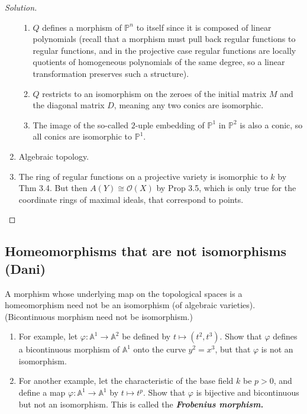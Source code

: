 \begin{manualexercise}{3.1}
\begin{proof}[Solution]
\begin{enumerate}[label=\alph*.]
\begin{enumerate}[label=\textbf{Step \arabic*}]
				\item $Q$ defines a morphism of $\mathbb{P}^n$ to itself since it is composed of linear polynomials (recall that a morphism must pull back regular functions to regular functions, and in the projective case regular functions are locally quotients of homogeneous polynomials of the same degree, so a linear transformation preserves such a structure).

				\item $Q$ restricts to an isomorphism on the zeroes of the initial matrix $M$ and the diagonal matrix $D$, meaning any two conics are isomorphic.

				\item The image of the so-called $2$-uple embedding of $\mathbb{P}^1$ in $\mathbb{P}^2$ is also a conic, so all conics are isomorphic to $\mathbb{P}^1$.
			\end{enumerate}

	\item Algebraic topology.

	\item The ring of regular functions on a projective variety is isomorphic to $k$ by Thm 3.4. But then $A(Y)\cong \mathcal{O}(X)$ by Prop 3.5, which is only true for the coordinate rings of maximal ideals, that correspond to points.

	\end{enumerate}
\end{proof}

\end{manualexercise}

\subsection{Homeomorphisms that are not isomorphisms (Dani)}

\begin{manualexercise}{3.2}
	A morphism whose underlying map on the topological spaces is a homeomorphism need not be an isomorphism (of algebraic varieties). (Bicontinuous morphism need not be isomorphism.)
	\begin{enumerate}[label=\alph*.]
		\item For example, let $\varphi:\mathbb{A}^1\to \mathbb{A}^2$ be defined by $t\mapsto (t^2,t^3)$. Show that $\varphi$ defines a bicontinuous morphism of $\mathbb{A}^1$ onto the curve $y^2=x^3$, but that $\varphi$ is not an isomorphism.

		\item For another example, let the characteristic of the base field $k$ be $p>0$, and define a map $\varphi:\mathbb{A}^1\to \mathbb{A}^1$ by $t\mapsto t^p$. Show that $\varphi$ is bijective and bicontinuous but not an isomorphism. This is called the \textit{\textbf{Frobenius morphism.}}
	\end{enumerate}
\end{manualexercise}


